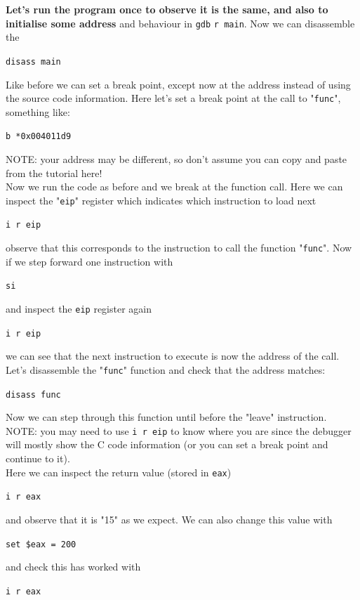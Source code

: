 \documentclass{article}
\begin{document}
\noindent\textbf{Let's run the program once to observe it is the same, and also to initialise some address} and behaviour in \lstinline{gdb} \lstinline{r main}. Now we can disassemble the 
\begin{center}
    \lstinline{disass main}
\end{center}
\noindent Like before we can set a break point, except now at the address instead of using the source code information. Here let's set a break point at the call to
"\lstinline{func}", something like:
\begin{center}
    \lstinline{b *0x004011d9}
\end{center}
\noindent NOTE: your address may be different, so don't assume you can copy and paste from the tutorial here!\\

\noindent Now we run the code as before and we break at the function call. Here we can inspect the "\lstinline{eip}" register
which indicates which instruction to load next
\begin{center}
    \lstinline{i r eip}
\end{center}
observe that this corresponds to the instruction to call the function "\lstinline{func}".
Now if we step forward one instruction with
\begin{center}
    \lstinline{si}
\end{center}
\noindent and inspect the \lstinline{eip} register again
\begin{center}
    \lstinline{i r eip}
\end{center}
\noindent we can see that the next instruction to execute is now the address of the call.
Let's disassemble the "\lstinline{func}" function and check that the address matches:
\begin{center}
    \lstinline{disass func}
\end{center}
\noindent Now we can step through this function until before the "leave" instruction.\\

\noindent NOTE: you may need to use \lstinline{i r eip} to know where you are since the debugger will mostly show the C code information (or you can set a break point and continue to it).\\

\noindent Here we can inspect the return value (stored in \lstinline{eax})
\begin{center}
    \lstinline{i r eax}
\end{center}
\noindent and observe that it is "15" as we expect. We can also change this value with
\begin{center}
    \lstinline[mathescape=false]{set $eax = 200}
\end{center}
\noindent and check this has worked with
\begin{center}
    \lstinline{i r eax}
\end{center}
\end{document}
